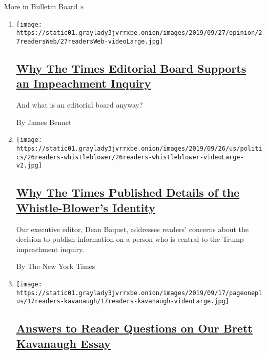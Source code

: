 \href{/series/bulletin-board}{More in Bulletin Board »}

\begin{enumerate}
\def\labelenumi{\arabic{enumi}.}
\item
  \texttt{[image: https://static01.graylady3jvrrxbe.onion/images/2019/09/27/opinion/27readersWeb/27readersWeb-videoLarge.jpg]}

  \hypertarget{why-the-times-editorial-board-supports-an-impeachment-inquiry}{%
  \subsection{\texorpdfstring{\href{/2019/09/27/reader-center/impeachment-editorial-board.html}{Why
  The Times Editorial Board Supports an Impeachment
  Inquiry}}{Why The Times Editorial Board Supports an Impeachment Inquiry}}\label{why-the-times-editorial-board-supports-an-impeachment-inquiry}}

  And what is an editorial board anyway?

  By James Bennet
\item
  \texttt{[image: https://static01.graylady3jvrrxbe.onion/images/2019/09/26/us/politics/26readers-whistleblower/26readers-whistleblower-videoLarge-v2.jpg]}

  \hypertarget{why-the-times-published-details-of-the-whistle-blowers-identity}{%
  \subsection{\texorpdfstring{\href{/2019/09/26/reader-center/whistle-blower-identity.html}{Why
  The Times Published Details of the Whistle-Blower's
  Identity}}{Why The Times Published Details of the Whistle-Blower's Identity}}\label{why-the-times-published-details-of-the-whistle-blowers-identity}}

  Our executive editor, Dean Baquet, addresses readers' concerns about
  the decision to publish information on a person who is central to the
  Trump impeachment inquiry.

  By The New York Times
\item
  \texttt{[image: https://static01.graylady3jvrrxbe.onion/images/2019/09/17/pageoneplus/17readers-kavanaugh/17readers-kavanaugh-videoLarge.jpg]}

  \hypertarget{answers-to-reader-questions-on-our-brett-kavanaugh-essay}{%
  \subsection{\texorpdfstring{\href{/2019/09/16/reader-center/brett-kavanaugh-accusation-yale.html}{Answers
  to Reader Questions on Our Brett Kavanaugh
  Essay}}{Answers to Reader Questions on Our Brett Kavanaugh Essay}}\label{answers-to-reader-questions-on-our-brett-kavanaugh-essay}}


\end{enumerate}
